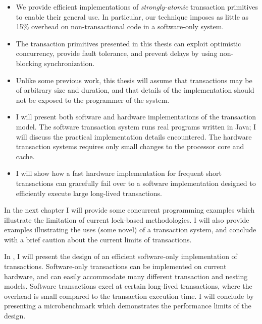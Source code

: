 \begin{itemize}
\item We provide efficient implementations of
\textit{strongly-atomic} transaction primitives to enable their general use.
In particular, our technique imposes as little as 15\% overhead on
non-transactional code in a software-only system.

\item The transaction
primitives presented in this thesis can exploit optimistic
concurrency, provide fault tolerance, and prevent delays by using
non-blocking synchronization.

\item Unlike some previous work, this thesis will assume that
transactions may be of arbitrary size and duration, and that details
of the implementation should not be exposed to the programmer of the
system.

\item I will present both software and hardware implementations of the
transaction model.
The software transaction system runs real programs written in
Java; I will discuss the practical implementation details encountered.
The hardware transaction systems requires only small changes to the
processor core and cache.

\item I will show how a fast hardware implementation for
frequent short transactions can gracefully fail over to a software
implementation designed to efficiently execute large long-lived
transactions.
\end{itemize}

In the next chapter I will provide some concurrent programming
examples which illustrate the limitation of current lock-based
methodologies.  I will also provide examples illustrating the uses
(some novel) of a transaction system, and conclude with a brief
caution about the current limits of transactions.

In , I will present the design of an efficient software-only
implementation of transactions.  Software-only transactions can be
implemented on current hardware, and can easily accommodate many
different transaction and nesting models.  Software transactions excel
at certain long-lived transactions, where the overhead is
small compared to the transaction execution time.  I will conclude by
presenting a microbenchmark which demonstrates the performance limits of
the design.

